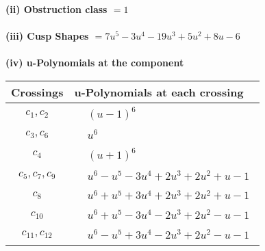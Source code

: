 \documentclass[1p]{elsarticle_modified}
\theoremstyle{definition}
\begin{document}
\flushleft \textbf{(ii) Obstruction class $= 1$}\\~\\
\flushleft \textbf{(iii) Cusp Shapes $= 7 u^5-3 u^4-19 u^3+5 u^2+8 u-6$}\\~\\
\newpage\renewcommand{\arraystretch}{1}
\flushleft \textbf{(iv) u-Polynomials at the component}\newline \\
\begin{tabular}{m{50pt}|m{274pt}}
Crossings & \hspace{64pt}u-Polynomials at each crossing \\
\hline $$\begin{aligned}c_{1},c_{2}\end{aligned}$$&$\begin{aligned}
&(u-1)^6
\end{aligned}$\\
\hline $$\begin{aligned}c_{3},c_{6}\end{aligned}$$&$\begin{aligned}
&u^6
\end{aligned}$\\
\hline $$\begin{aligned}c_{4}\end{aligned}$$&$\begin{aligned}
&(u+1)^6
\end{aligned}$\\
\hline $$\begin{aligned}c_{5},c_{7},c_{9}\end{aligned}$$&$\begin{aligned}
&u^6- u^5-3 u^4+2 u^3+2 u^2+u-1
\end{aligned}$\\
\hline $$\begin{aligned}c_{8}\end{aligned}$$&$\begin{aligned}
&u^6+u^5+3 u^4+2 u^3+2 u^2+u-1
\end{aligned}$\\
\hline $$\begin{aligned}c_{10}\end{aligned}$$&$\begin{aligned}
&u^6+u^5-3 u^4-2 u^3+2 u^2- u-1
\end{aligned}$\\
\hline $$\begin{aligned}c_{11},c_{12}\end{aligned}$$&$\begin{aligned}
&u^6- u^5+3 u^4-2 u^3+2 u^2- u-1
\end{aligned}$\\
\hline
\end{tabular}\\~\\
\end{document}
